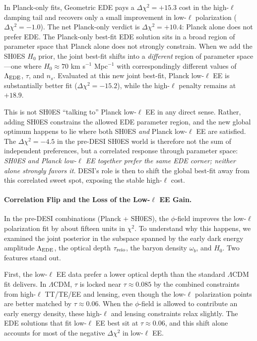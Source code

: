 \documentclass[a4paper,11pt]{article}
\begin{document}
In Planck-only fits, Geometric EDE pays a $\Delta\chi^2 = +15.3$ cost in the high-$\ell$ damping tail and recovers only a small improvement in low-$\ell$ polarization ($\Delta\chi^2 = -1.0$). The net Planck-only verdict is $\Delta\chi^2 = +10.4$: Planck alone does not prefer EDE. The Planck-only best-fit EDE solution sits in a broad region of parameter space that Planck alone does not strongly constrain. When we add the SH0ES $H_0$ prior, the joint best-fit shifts into a \emph{different} region of parameter space---one where $H_0 \approx 70$ km s$^{-1}$ Mpc$^{-1}$ with correspondingly different values of $\Lambda_{\rm EDE}$, $\tau$, and $n_s$. Evaluated at this new joint best-fit, Planck low-$\ell$ EE is substantially better fit ($\Delta\chi^2 = -15.2$), while the high-$\ell$ penalty remains at $+18.9$.

This is not SH0ES ``talking to'' Planck low-$\ell$ EE in any direct sense. Rather, adding SH0ES constrains the allowed EDE parameter region, and the new global optimum happens to lie where both SH0ES \emph{and} Planck low-$\ell$ EE are satisfied. The $\Delta\chi^2 = -4.5$ in the pre-DESI SH0ES world is therefore not the sum of independent preferences, but a correlated response through parameter space: \emph{SH0ES and Planck low-$\ell$ EE together prefer the same EDE corner; neither alone strongly favors it.} DESI's role is then to shift the global best-fit away from this correlated sweet spot, exposing the stable high-$\ell$ cost.

\paragraph{Correlation Flip and the Loss of the Low-$\ell$ EE Gain.}
\label{sec:correlation_flip}
In the pre-DESI combinations (Planck + SH0ES), the $\phi$-field improves the low-$\ell$ polarization fit by about fifteen units in $\chi^2$. To understand why this happens, we examined the joint posterior in the subspace spanned by the early dark energy amplitude $\Lambda_{\rm EDE}$, the optical depth $\tau_{\rm reio}$, the baryon density $\omega_b$, and $H_0$. Two features stand out.

First, the low-$\ell$ EE data prefer a lower optical depth than the standard $\Lambda$CDM fit delivers. In $\Lambda$CDM, $\tau$ is locked near $\tau \approx 0.085$ by the combined constraints from high-$\ell$ TT/TE/EE and lensing, even though the low-$\ell$ polarization points are better matched by $\tau \approx 0.06$. When the $\phi$-field is allowed to contribute an early energy density, these high-$\ell$ and lensing constraints relax slightly. The EDE solutions that fit low-$\ell$ EE best sit at $\tau \approx 0.06$, and this shift alone accounts for most of the negative $\Delta\chi^2$ in low-$\ell$ EE.
\end{document}

